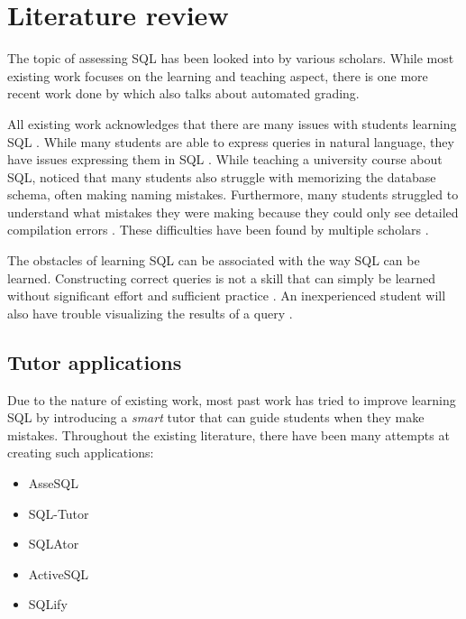 \section{Literature review}

The topic of assessing SQL has been looked into by various scholars. While most existing work focuses on the learning and teaching aspect, there is one more recent work done by \cite{literature:xdata} which also talks about automated grading.

All existing work acknowledges that there are many issues with students learning SQL \citep{literature:assesql, literature:sqlify}. While many students are able to express queries in natural language, they have issues expressing them in SQL \citep{literature:mitrovic}. While teaching a university course about SQL, \cite{literature:mitrovic} noticed that many students also struggle with memorizing the database schema, often making naming mistakes. Furthermore, many students struggled to understand what mistakes they were making because they could only see detailed compilation errors \citep{literature:mitrovic}. These difficulties have been found by multiple scholars \citep{literature:assesql, literature:sqlify, literature:kearns, literature:mitrovic}.

The obstacles of learning SQL can be associated with the way SQL can be learned. Constructing correct queries is not a skill that can simply be learned without significant effort and sufficient practice \citep{literature:assesql}. An inexperienced student will also have trouble visualizing the results of a query \citep{literature:assesql}.

\subsection{Tutor applications} \label{ch:lit:sec:tutor}

Due to the nature of existing work, most past work has tried to improve learning SQL by introducing a \textit{smart} tutor that can guide students when they make mistakes. Throughout the existing literature, there have been many attempts at creating such applications:

\begin{itemize}
    \item AsseSQL \citep{literature:assesql}
    \item SQL-Tutor \citep{literature:kearns}
    \item SQLAtor \citep{literature:sqlator}
    \item ActiveSQL \citep{literature:activesql}
    \item SQLify \citep{literature:sqlify}
\end{itemize}

